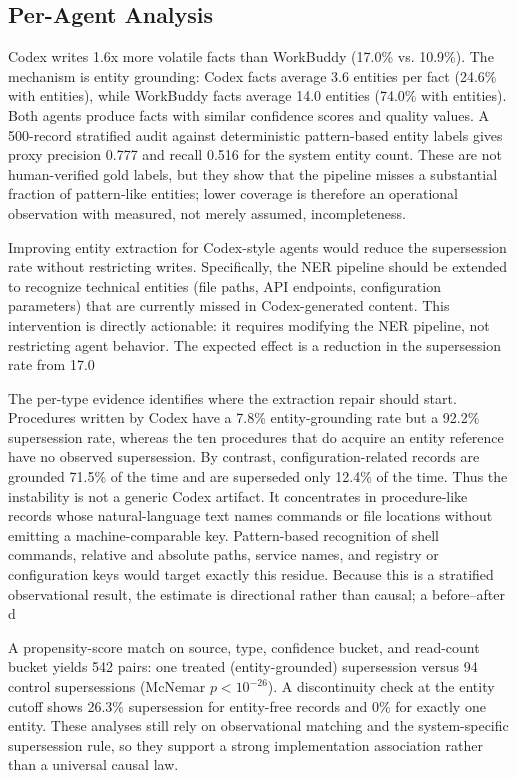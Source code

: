 \documentclass[sigconf,nonacm]{acmart}
\begin{document}
\subsection{Per-Agent Analysis}
\label{sec:per-agent}

Codex writes 1.6x more volatile facts than WorkBuddy (17.0\% vs. 10.9\%). The mechanism is entity grounding: Codex facts average 3.6 entities per fact (24.6\% with entities), while WorkBuddy facts average 14.0 entities (74.0\% with entities). Both agents produce facts with similar confidence scores and quality values. A 500-record stratified audit against deterministic pattern-based entity labels gives proxy precision 0.777 and recall 0.516 for the system entity count. These are not human-verified gold labels, but they show that the pipeline misses a substantial fraction of pattern-like entities; lower coverage is therefore an operational observation with measured, not merely assumed, incompleteness.

Improving entity extraction for Codex-style agents would reduce the supersession rate without restricting writes. Specifically, the NER pipeline should be extended to recognize technical entities (file paths, API endpoints, configuration parameters) that are currently missed in Codex-generated content. This intervention is directly actionable: it requires modifying the NER pipeline, not restricting agent behavior. The expected effect is a reduction in the supersession rate from 17.0%

The per-type evidence identifies where the extraction repair should start. Procedures written by Codex have a 7.8\% entity-grounding rate but a 92.2\% supersession rate, whereas the ten procedures that do acquire an entity reference have no observed supersession. By contrast, configuration-related records are grounded 71.5\% of the time and are superseded only 12.4\% of the time. Thus the instability is not a generic Codex artifact. It concentrates in procedure-like records whose natural-language text names commands or file locations without emitting a machine-comparable key. Pattern-based recognition of shell commands, relative and absolute paths, service names, and registry or configuration keys would target exactly this residue. Because this is a stratified observational result, the estimate is directional rather than causal; a before--after d

A propensity-score match on source, type, confidence bucket, and read-count bucket yields 542 pairs: one treated (entity-grounded) supersession versus 94 control supersessions (McNemar $p<10^{-26}$). A discontinuity check at the entity cutoff shows 26.3\% supersession for entity-free records and 0\% for exactly one entity. These analyses still rely on observational matching and the system-specific supersession rule, so they support a strong implementation association rather than a universal causal law. 
\end{document}
